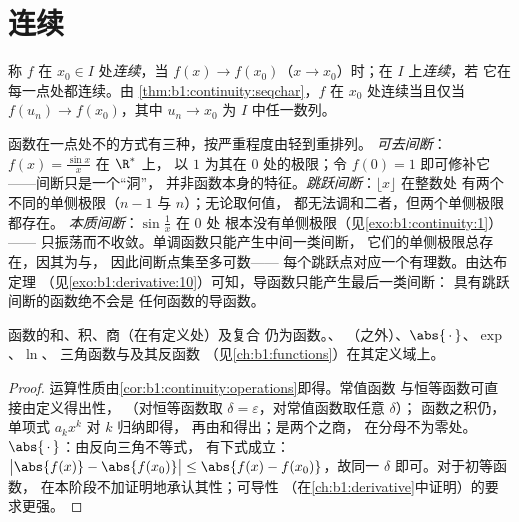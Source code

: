 \section{连续}

\begin{definition}\label{def:b1:continuity:continuous}
称 $f$ 在 $x_0 \in I$ 处\emph{连续}，当 $f(x)
\to f(x_0)$（$x \to x_0$）时；在 $I$ 上\emph{连续}，若
它在每一点处都连续。由
\cref{thm:b1:continuity:seqchar}，$f$ 在 $x_0$ 处连续当且仅当
$f(u_n) \to f(x_0)$，其中 $u_n \to x_0$ 为 $I$ 中任一数列。
\end{definition}

\begin{example}[间断点的分类]\label{ex:b1:continuity:taxonomy}
函数在一点处不的方式有三种，按严重程度由轻到重排列。
\emph{可去间断}：$f(x) = \frac{\sin x}{x}$ 在 $\R^*$ 上，
以 $1$ 为其在 $0$ 处的极限；令 $f(0) = 1$ 即可修补它——间断只是一个“洞”，
并非函数本身的特征。\emph{跳跃间断}：$\lfloor x \rfloor$ 在整数处
有两个不同的单侧极限（$n - 1$ 与 $n$）；无论取何值，
都无法调和二者，但两个单侧极限都存在。
\emph{本质间断}：$\sin\frac1x$ 在 $0$ 处
根本没有单侧极限（见\cref{exo:b1:continuity:1}）——
只振荡而不收敛。单调函数只能产生中间一类间断，
它们的单侧极限总存在，因其为与，
因此间断点集至多可数——
每个跳跃点对应一个有理数。由达布定理
（见\cref{exo:b1:derivative:10}）可知，导函数只能产生最后一类间断：
具有跳跃间断的函数绝不会是
任何函数的导函数。
\end{example}

\begin{proposition}\label{prop:b1:continuity:algebra}
函数的和、积、商（在有定义处）及复合
仍为函数。、
（之外）、$\abs{\,\cdot\,}$、$\exp$、$\ln$、
三角函数与及其反函数
（见\cref{ch:b1:functions}）在其定义域上。
\end{proposition}

\begin{proof}
运算性质由\cref{cor:b1:continuity:operations}即得。常值函数
与恒等函数可直接由定义得出性，
（对恒等函数取 $\delta = \varepsilon$，对常值函数取任意 $\delta$）；
函数之积仍，
单项式 $a_k x^k$ 对 $k$ 归纳即得，
再由和得出；是两个之商，
在分母不为零处。
$\abs{\,\cdot\,}$：由反向三角不等式，
有下式成立：$\bigl|\abs{f(x)} - \abs{f(x_0)}\bigr| \leq \abs{f(x) -
f(x_0)}$，故同一 $\delta$ 即可。对于初等函数，
在本阶段不加证明地承认其性；可导性
（在\cref{ch:b1:derivative}中证明）的要求更强。
\end{proof}

